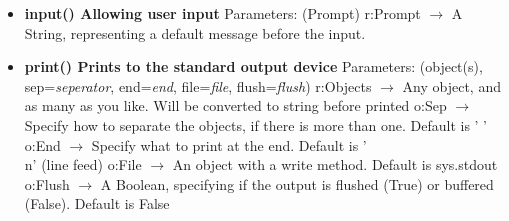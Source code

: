 \documentclass{report}
\begin{document}
\begin{itemize}
        \item[\ding{43}] \textbf{input()	Allowing user input}
          \smallbreak \noindent
          Parameters: (Prompt)
          \smallbreak \noindent
          r:Prompt $\rightarrow$ 	A String, representing a default message before the input.
          \smallbreak \noindent
        \item[\ding{43}] \textbf{print()	Prints to the standard output device}
          \smallbreak \noindent
          Parameters: (object(s), sep=\textit{seperator}, end=\textit{end}, file=\textit{file}, flush=\textit{flush})
          \smallbreak \noindent
          r:Objects $\rightarrow$ 	Any object, and as many as you like. Will be converted to string before printed
          \smallbreak \noindent
          o:Sep $\rightarrow$ Specify how to separate the objects, if there is more than one. Default is ' '
          \smallbreak \noindent
          o:End $\rightarrow$ Specify what to print at the end. Default is '\\n' (line feed)
          \smallbreak \noindent
          o:File $\rightarrow$ An object with a write method. Default is sys.stdout
          \smallbreak \noindent
          o:Flush $\rightarrow$ A Boolean, specifying if the output is flushed (True) or buffered (False). Default is False
          \smallbreak \noindent
      \end{itemize}
    
\end{document}
